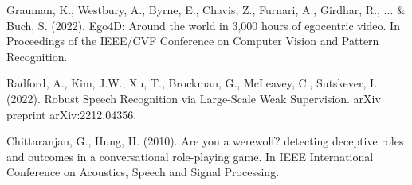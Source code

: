 \documentclass{article}
\begin{document}
\begin{thebibliography}{10}
Grauman, K., Westbury, A., Byrne, E., Chavis, Z., Furnari, A., Girdhar, R., ... \& Buch, S. (2022). Ego4D: Around the world in 3,000 hours of egocentric video. In Proceedings of the IEEE/CVF Conference on Computer Vision and Pattern Recognition.

Radford, A., Kim, J.W., Xu, T., Brockman, G., McLeavey, C., Sutskever, I. (2022). Robust Speech Recognition via Large-Scale Weak Supervision. arXiv preprint arXiv:2212.04356.

Chittaranjan, G., Hung, H. (2010). Are you a werewolf? detecting deceptive roles and outcomes in a conversational role-playing game. In IEEE International Conference on Acoustics, Speech and Signal Processing.

\end{thebibliography}
\end{document}
